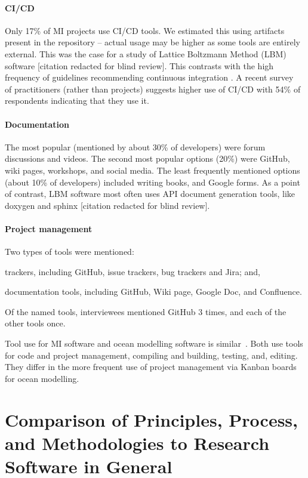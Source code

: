 \documentclass[doubleblind,12pt, 3p, times]{elsarticle}
\begin{document}
\paragraph{CI/CD} 
Only 17\% of MI projects use CI/CD tools. We estimated this using artifacts
present in the repository -- actual usage may be higher as some tools are
entirely external. This was the case for a study of Lattice Boltzmann Method
(LBM) software [citation redacted for blind review].  %
This contrasts with the high frequency of guidelines recommending continuous
integration
\cite{BrettEtAl2021, Brown2015, ThielEtAl2020, Zadka2018, vanGompelEtAl2016}.
A recent survey~\cite{CarverEtAl2022} of practitioners (rather than projects)
suggests higher use of CI/CD with 54\% of respondents indicating that they use
it.

\paragraph{Documentation} The most popular (mentioned by about 30\% of
developers) were forum discussions and videos.  The second most popular options
(20\%) were GitHub, wiki pages, workshops, and social media. The least
frequently mentioned options (about 10\% of developers) included writing books,
and Google forms.  As a point of contrast, LBM software most often uses API
document generation tools, like doxygen and sphinx [citation redacted for blind
review].

\paragraph{Project management} Two types of tools were mentioned:
\begin{inparaenum}[i)]
\item trackers, including GitHub, issue trackers, bug trackers and Jira; and,
\item documentation tools, including GitHub, Wiki page, Google Doc, and
Confluence.
\end{inparaenum}
Of the named tools, interviewees mentioned GitHub 3 times, and each
of the other tools once.

Tool use for MI software and ocean modelling software is
similar~\cite{JungEtAl2022}.  Both use tools for code and project management,
compiling and building, testing, and, editing. They differ in the more frequent
use of project management via Kanban boards for ocean modelling.

\section[Comparison to Other Research Software]{Comparison of Principles, Process, and
Methodologies to Research Software in General} \label{Sec_CompareMethodologies}
\end{document}
